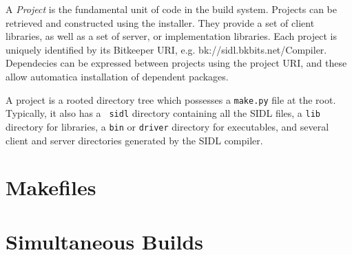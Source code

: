 A {\em Project} is the fundamental unit of code in the build system. Projects can be retrieved and constructed using the
installer. They provide a set of client libraries, as well as a set of server, or implementation libraries. Each project
is uniquely identified by its Bitkeeper URI, e.g. bk://sidl.bkbits.net/Compiler. Dependecies can be expressed between
projects using the project URI, and these allow automatica installation of dependent packages.

A project is a rooted directory tree which possesses a {\tt make.py} file at the root. Typically, it also has a {\tt
sidl} directory containing all the SIDL files, a {\tt lib} directory for libraries, a {\tt bin} or {\tt driver}
directory for executables, and several client and server directories generated by the SIDL compiler.

\section{Makefiles}

\section{Simultaneous Builds}

